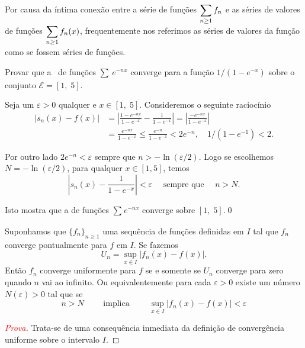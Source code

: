 \begin{obs}
Por causa da íntima conexão entre a série de funções
$\displaystyle{\sum_{n\geq 1}f_n}$ e as séries de valores de funções
$\displaystyle{\sum_{n\geq 1}f_n(x)}$, frequentemente nos referimos as
séries de valores da função como se fossem séries de funções.
\end{obs}

\begin{exer}
Provar que a \sers\ de funções $\sum_{}\,e^{-nx}$
converge \unif para a função  $1/(1-e^{-x})$ sobre o conjunto
$\mathcal{E}=[1,\; 5]$.
\end{exer}

\solo Seja um $\varepsilon>0$ qualquer e $x\in [1,\; 5]$.
Consideremos o seguinte raciocínio
\begin{align*}
|s_n(x)-f(x)|&=\left|\frac{1-e^{-nx}}{1-e^{-x}}-\frac{1}{1-e^{-x}}\right|
=\left|\frac{-e^{-nx}}{1-e^{-x}}\right|\\[2ex]
&=\frac{e^{-nx}}{1-e^{-x}}\le \frac{e^{-n}}{1-e^{-1}}<2e^{-n},
\quad 1/(1-e^{-1})<2.
\end{align*}

Por outro lado $2e^{-n}<\varepsilon$ sempre que
$n>-\ln(\varepsilon/2)$. Logo se escolhemos
$N=-\ln(\varepsilon/2)$, para qualquer $x\in [1,5]$, temos
\begin{equation*}
    \left|s_n(x)-\frac{1}{1-e^{-x}}\right|<\varepsilon\quad
    \text{ sempre que }\quad n>N.
\end{equation*}

Isto mostra que a \sers de funções $\sum_{}e^{-nx}$ converge \unif sobre $[1,\; 5]$.\qed

\begin{theoc}{}{}
Suponhamos que $\{ f_n\}_{n\ge 1}$ uma sequência de funções
definidas em $I$ tal que $f_n$ converge pontualmente para $f$ em
$I$. Se fazemos
\begin{equation*}
    U_n=\sup_{x\in I}|f_n(x)-f(x)|.
\end{equation*}
Então $f_n$ converge uniformente para $f$ se e somente se $U_n$
converge para zero quando $n$ vai ao infinito. Ou equivalentemente
para cada $\varepsilon>0$ existe um número $N(\varepsilon)>0$ tal
que se
\begin{equation*}
n>N\qquad \textrm{ implica }\qquad \sup_{x\in I}|f_n(x)-f(x)|<\varepsilon
\end{equation*}
\end{theoc}

\begin{proof}[\textcolor{red}{Prova}]
Trata-se de uma consequência inmediata da definição de
convergência uniforme sobre o intervalo $I$.
\end{proof}


